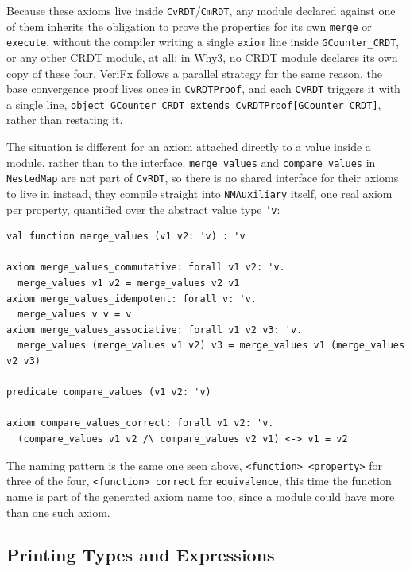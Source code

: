 Because these axioms live inside \texttt{CvRDT}/\texttt{CmRDT}, any module declared against one of them inherits the
obligation to prove the properties for its own \texttt{merge} or \texttt{execute}, without the compiler writing a single
\texttt{axiom} line inside \texttt{GCounter\_CRDT}, or any other CRDT module, at all: in Why3, no CRDT module declares
its own copy of these four. VeriFx follows a parallel strategy for the same reason, the base convergence proof lives once
in \texttt{CvRDTProof}, and each \texttt{CvRDT} triggers it with a single line,
\texttt{object GCounter\_CRDT extends CvRDTProof[GCounter\_CRDT]}, rather than restating it.

The situation is different for an axiom attached directly to a value inside a module, rather than to the interface.
\texttt{merge\_values} and \texttt{compare\_values} in \texttt{NestedMap} are not part of \texttt{CvRDT}, so there is no
shared interface for their axioms to live in instead, they compile straight into \texttt{NMAuxiliary} itself, one real
axiom per property, quantified over the abstract value type \texttt{'v}:

\begin{lstlisting}[caption={\texttt{merge\_values} and its axioms, generated inside \texttt{NMAuxiliary}}, label={lst:w3-nestedmap-axioms}]
val function merge_values (v1 v2: 'v) : 'v

axiom merge_values_commutative: forall v1 v2: 'v.
  merge_values v1 v2 = merge_values v2 v1
axiom merge_values_idempotent: forall v: 'v.
  merge_values v v = v
axiom merge_values_associative: forall v1 v2 v3: 'v.
  merge_values (merge_values v1 v2) v3 = merge_values v1 (merge_values v2 v3)

predicate compare_values (v1 v2: 'v)

axiom compare_values_correct: forall v1 v2: 'v.
  (compare_values v1 v2 /\ compare_values v2 v1) <-> v1 = v2
\end{lstlisting}

The naming pattern is the same one seen above, \texttt{<function>\_<property>} for three of the four,
\texttt{<function>\_correct} for \texttt{equivalence}, this time the function name is part of the generated axiom name
too, since a module could have more than one such axiom.

\subsection{Printing Types and Expressions}
\label{sub:w3-types}

